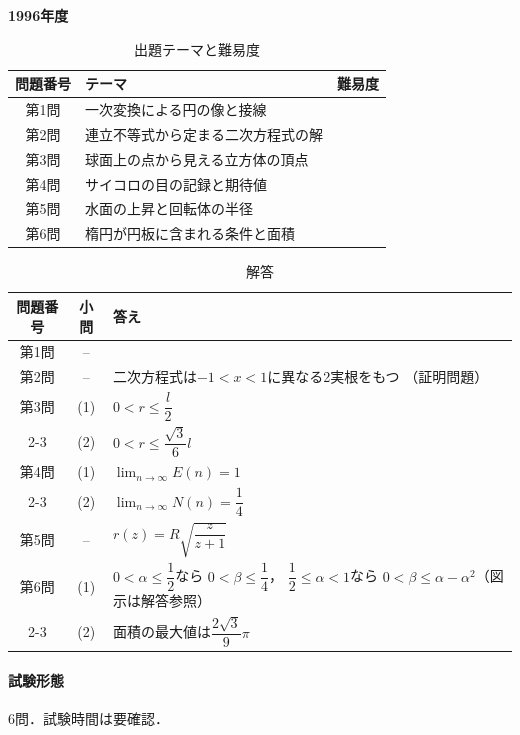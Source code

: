 \documentclass[../../main.tex]{subfiles}
\begin{document}
\begin{center}
  {\fontsize{48pt}{58pt}\selectfont \textbf{1996}\normalsize\textbf{年度}}
\end{center}

\begin{table}[htb]
  \centering
  \caption{出題テーマと難易度}
  \begin{tabular}{|c|p{9cm}|c|}
    \hline
    \textbf{問題番号} & \textbf{テーマ} & \textbf{難易度} \\
    \hline
    第1問 & 一次変換による円の像と接線 & \\
    \hline
    第2問 & 連立不等式から定まる二次方程式の解 & \\
    \hline
    第3問 & 球面上の点から見える立方体の頂点 & \\
    \hline
    第4問 & サイコロの目の記録と期待値 & \\
    \hline
    第5問 & 水面の上昇と回転体の半径 & \\
    \hline
    第6問 & 楕円が円板に含まれる条件と面積 & \\
    \hline
  \end{tabular}
\end{table}

\begin{table}[htb]
  \centering
  \caption{解答}
  \renewcommand{\arraystretch}{1.4}
  \begin{tabular}{|c|c|p{9cm}|}
    \hline
    \textbf{問題番号} & \textbf{小問} & \textbf{答え} \\
    \hline
    第1問 & -- & \\
    \hline
    第2問 & -- & 二次方程式は$-1<x<1$に異なる2実根をもつ
    （証明問題） \\
    \hline
    第3問 & (1) & $0<r\le\dfrac{l}{2}$ \\
    \cline{2-3}
    & (2) & $0<r\le\dfrac{\sqrt{3}}{6}l$ \\
    \hline
    第4問 & (1) & $\displaystyle\lim_{n\to\infty}E(n)=1$ \\
    \cline{2-3}
    & (2) & $\displaystyle\lim_{n\to\infty}N(n)=\dfrac{1}{4}$ \\
    \hline
    第5問 & -- & $r(z)=R\sqrt{\dfrac{z}{z+1}}$ \\
    \hline
    第6問 & (1) & $0<\alpha\le\dfrac{1}{2}$なら
    $0<\beta\le\dfrac{1}{4}$，
    $\dfrac{1}{2}\le\alpha<1$なら
    $0<\beta\le\alpha-\alpha^2$（図示は解答参照） \\
    \cline{2-3}
    & (2) & 面積の最大値は$\dfrac{2\sqrt{3}}{9}\pi$ \\
    \hline
  \end{tabular}
\end{table}

\paragraph{試験形態}
6問．試験時間は要確認．
\end{document}
